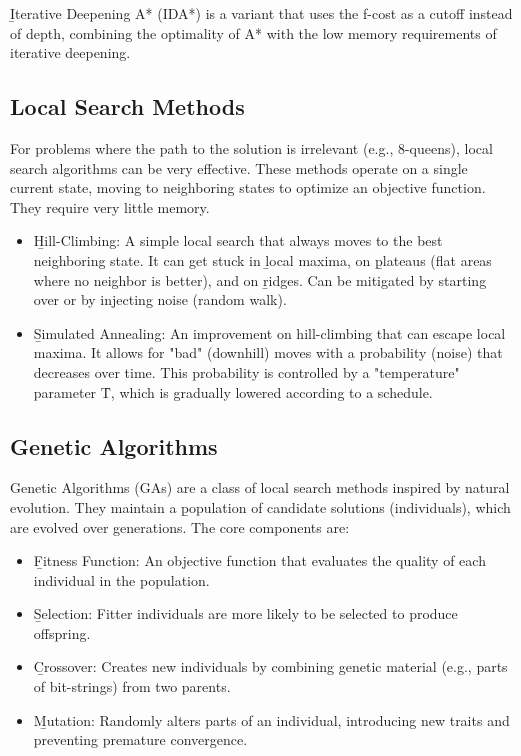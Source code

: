 \b{Iterative Deepening A* (IDA*)} is a variant that uses the f-cost as a cutoff instead of depth, combining the optimality of A* with the low memory requirements of iterative deepening.

\subsection{Local Search Methods}
For problems where the path to the solution is irrelevant (e.g., 8-queens), local search algorithms can be very effective. These methods operate on a single current state, moving to neighboring states to optimize an objective function. They require very little memory.
\begin{itemize}
    \item \b{Hill-Climbing:} A simple local search that always moves to the best neighboring state. It can get stuck in \b{local maxima}, on \b{plateaus} (flat areas where no neighbor is better), and on \b{ridges}. Can be mitigated by starting over or by injecting noise (random walk).
    \item \b{Simulated Annealing:} An improvement on hill-climbing that can escape local maxima. It allows for "bad" (downhill) moves with a probability (noise) that decreases over time. This probability is controlled by a "temperature" parameter \f{T}, which is gradually lowered according to a schedule.
\end{itemize}

\subsection{Genetic Algorithms}
Genetic Algorithms (GAs) are a class of local search methods inspired by natural evolution. They maintain a \b{population} of candidate solutions (individuals), which are evolved over generations. The core components are:
\begin{itemize}
    \item \b{Fitness Function:} An objective function that evaluates the quality of each individual in the population.
    \item \b{Selection:} Fitter individuals are more likely to be selected to produce offspring.
    \item \b{Crossover:} Creates new individuals by combining genetic material (e.g., parts of bit-strings) from two parents.
    \item \b{Mutation:} Randomly alters parts of an individual, introducing new traits and preventing premature convergence.
\end{itemize}